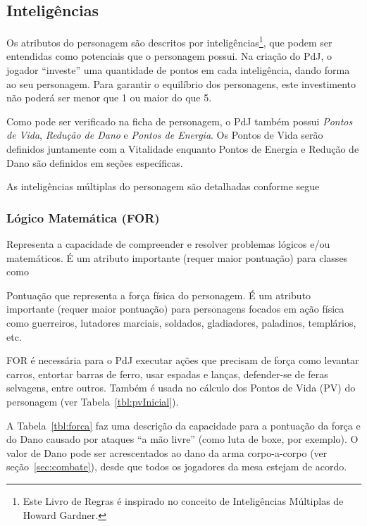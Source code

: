 \subsection{\label{subsecInteligencias}Inteligências}
Os atributos do personagem são descritos por inteligências\footnote{Este Livro de Regras é inspirado no conceito de Inteligências Múltiplas de Howard Gardner.}, que podem ser entendidas como potenciais que o personagem possui. Na criação do PdJ, o jogador ``investe'' uma quantidade de pontos em cada inteligência, dando forma ao seu personagem. Para garantir o equilíbrio dos personagens, este investimento não poderá ser menor que 1 ou maior do que 5.

Como pode ser verificado na ficha de personagem, o PdJ também possui \emph{Pontos de Vida}, \emph{Redução de Dano} e \emph{Pontos de Energia}. Os Pontos de Vida serão definidos juntamente com a Vitalidade enquanto Pontos de Energia e Redução de Dano são definidos em seções específicas.

As inteligências múltiplas do personagem são detalhadas conforme segue

\subsubsection*{Lógico Matemática (FOR)}
Representa a capacidade de compreender e resolver problemas lógicos e/ou matemáticos. É um atributo importante (requer maior pontuação) para classes como 

Pontuação que representa a força física do personagem. É um atributo importante (requer maior pontuação) para personagens focados em ação física como guerreiros, lutadores marciais, soldados, gladiadores, paladinos, templários, etc.

FOR é necessária para o PdJ executar ações que precisam de força como levantar carros, entortar barras de ferro, usar espadas e lanças, defender-se de feras selvagens, entre outros. Também é usada no cálculo dos Pontos de Vida (PV) do personagem (ver Tabela~\ref{tbl:pvInicial}).

A Tabela~\ref{tbl:forca} faz uma descrição da capacidade para a pontuação da força e do Dano causado por ataques ``a mão livre'' (como luta de boxe, por exemplo). O valor de Dano pode ser acrescentados ao dano da arma corpo-a-corpo (ver seção~\ref{sec:combate}), desde que todos os jogadores da mesa estejam de acordo.

